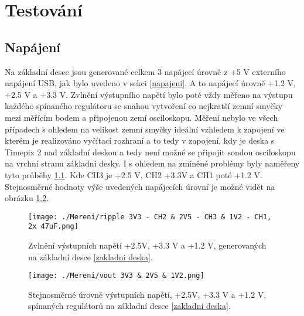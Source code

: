 \chapter{Testování}


\section{Napájení}
Na základní desce jsou generované celkem 3 napájecí úrovně z +5 V externího napájení USB, jak bylo uvedeno v sekci \ref{napajeni}. A to napájecí úrovně +1.2 V, +2.5 V a +3.3 V. Zvlnění výstupního napětí bylo poté vždy měřeno na výstupu každého spínaného regulátoru se snahou vytvoření co nejkratší zemní smyčky mezi měřícím bodem a připojenou zemí osciloskopu. Měření nebylo ve všech případech s ohledem na velikost zemní smyčky ideální vzhledem k zapojení ve kterém je realizováno vyčítací rozhraní a to tedy v zapojení, kdy je deska s Timepix 2 nad základní deskou a tedy není možné se připojit sondou osciloskopu na vrchní stranu základní desky. I s ohledem na zmíněné problémy byly naměřeny tyto průběhy \ref{fig:napeti}. Kde CH3 je +2.5 V, CH2 +3.3V a CH1 poté +1.2 V. Stejnosměrné hodnoty výše uvedených napájecích úrovní je možné vidět na obrázku \ref{fig:urovne}.
\begin{figure}[h!]
	\centering
	\captionsetup{justification=centering}
	\texttt{[image: ./Mereni/ripple 3V3 - CH2 \& 2V5 - CH3 \& 1V2 - CH1, 2x 47uF.png]}
	\caption{Zvlnění výstupních napětí +2.5V, +3.3 V a +1.2 V, generovaných na základní desce \ref{zakladni deska}.} 
	\label{fig:napeti}
\end{figure}

\begin{figure}[h!]
	\centering
	\captionsetup{justification=centering}
	\texttt{[image: ./Mereni/vout 3V3 \& 2V5 \& 1V2.png]}
	\caption{Stejnosměrné úrovně výstupních napětí, +2.5V, +3.3 V a +1.2 V, spínaných regulátorů na základní desce \ref{zakladni deska}.} 
	\label{fig:urovne}
\end{figure}

